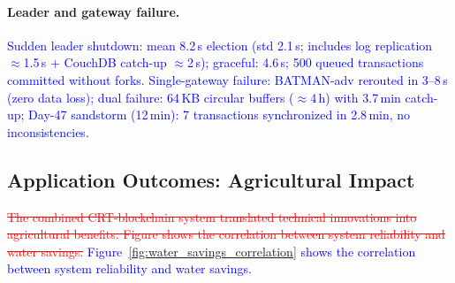 \documentclass[pdflatex,sn-mathphys-num]{sn-jnl}
\theoremstyle{thmstyleone}
\theoremstyle{thmstyletwo}
\theoremstyle{thmstylethree}
\begin{document}
{\paragraph{Leader and gateway failure.}
\textcolor{blue}{Sudden leader shutdown: mean 8.2\,s election (std 2.1\,s; includes log replication $\approx$1.5\,s + CouchDB catch-up $\approx$2\,s); graceful: 4.6\,s; 500 queued transactions committed without forks. Single-gateway failure: BATMAN-adv rerouted in 3--8\,s (zero data loss); dual failure: 64\,KB circular buffers ($\approx$4\,h) with 3.7\,min catch-up; Day-47 sandstorm (12\,min): 7 transactions synchronized in 2.8\,min, no inconsistencies.}

\subsection{Application Outcomes: Agricultural Impact}
\label{subsec:agricultural_impact}

\textcolor{red}{\sout{The combined CRT-blockchain system translated technical innovations into agricultural benefits. Figure shows the correlation between system reliability and water savings.}}
\textcolor{blue}{Figure~\ref{fig:water_savings_correlation} shows the correlation between system reliability and water savings.}

}
\end{document}

